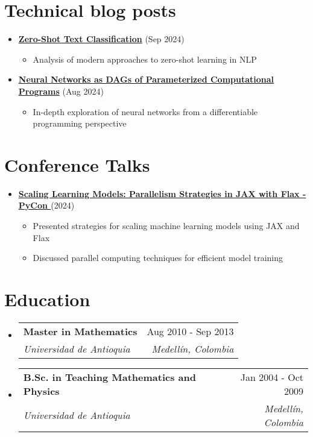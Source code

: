 \documentclass[letterpaper,11pt]{article}
\makeatletter
\newcommand{\resumeSubheading}[4]{
  \vspace{-2pt}
  \item[]
  \begin{tabular*}{\textwidth}{@{\extracolsep{\fill}}l r}
    \textbf{#1} & #2 \\
    \textit{#3} & \textit{#4} \\
  \end{tabular*}
  \vspace{-5pt}
}
\newcommand{\normalfaYoutube}{{\mdseries\faYoutube}}
\makeatother
\begin{document}
\section{Technical blog posts}
\begin{itemize}[leftmargin=*]
    \item \textbf{\href{https://www.asanchezyali.com/blog/ai/20240917ZeroShot}{Zero-Shot Text Classification}} (Sep 2024)
    \begin{itemize}
        \item Analysis of modern approaches to zero-shot learning in NLP
    \end{itemize}
    
    \item \textbf{\href{https://www.asanchezyali.com/blog/differentiable-programming/20240923DifferentiablePrograms}{Neural Networks as DAGs of Parameterized Computational Programs}} (Aug 2024)
    \begin{itemize}
        \item In-depth exploration of neural networks from a differentiable programming perspective
    \end{itemize}
\end{itemize}

\section{Conference Talks}
\begin{itemize}[leftmargin=*]
    \item \textbf{\href{https://www.youtube.com/watch?v=m4hP1soE414}{Scaling Learning Models: Parallelism Strategies in JAX with Flax - PyCon \normalfaYoutube}} (2024)
    \begin{itemize}
        \item Presented strategies for scaling machine learning models using JAX and Flax
        \item Discussed parallel computing techniques for efficient model training
    \end{itemize}
\end{itemize}

\section{Education}
\begin{itemize}[leftmargin=0pt, itemindent=0pt, label={}]
\resumeSubheading
{Master in Mathematics}{Aug 2010 - Sep 2013}
{Universidad de Antioquia}{Medellín, Colombia}

\resumeSubheading
{B.Sc. in Teaching Mathematics and Physics}{Jan 2004 - Oct 2009}
{Universidad de Antioquia}{Medellín, Colombia}
\end{itemize}
\end{document}
